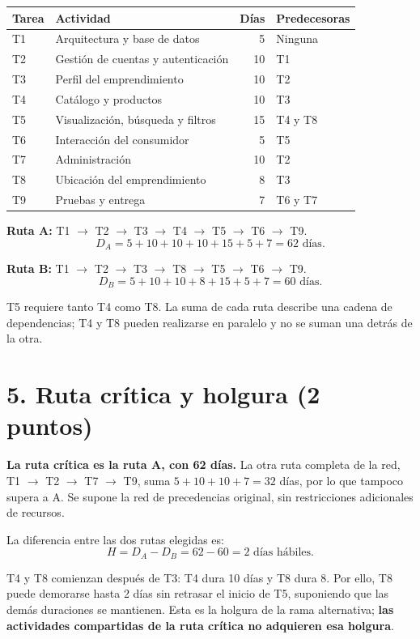 \documentclass[11pt,letterpaper]{article}
\begin{document}
\begin{center}\small
\begin{tabularx}{\linewidth}{@{}lYrY@{}}
\toprule
Tarea & Actividad & Días & Predecesoras \\\midrule
T1 & Arquitectura y base de datos & 5 & Ninguna \\
T2 & Gestión de cuentas y autenticación & 10 & T1 \\
T3 & Perfil del emprendimiento & 10 & T2 \\
T4 & Catálogo y productos & 10 & T3 \\
T5 & Visualización, búsqueda y filtros & 15 & T4 y T8 \\
T6 & Interacción del consumidor & 5 & T5 \\
T7 & Administración & 10 & T2 \\
T8 & Ubicación del emprendimiento & 8 & T3 \\
T9 & Pruebas y entrega & 7 & T6 y T7 \\\bottomrule
\end{tabularx}
\end{center}

\textbf{Ruta A:} T1 $\rightarrow$ T2 $\rightarrow$ T3 $\rightarrow$ T4
$\rightarrow$ T5 $\rightarrow$ T6 $\rightarrow$ T9.
\[
D_A=5+10+10+10+15+5+7=\boxed{62\text{ días}}.
\]

\textbf{Ruta B:} T1 $\rightarrow$ T2 $\rightarrow$ T3 $\rightarrow$ T8
$\rightarrow$ T5 $\rightarrow$ T6 $\rightarrow$ T9.
\[
D_B=5+10+10+8+15+5+7=\boxed{60\text{ días}}.
\]

T5 requiere tanto T4 como T8. La suma de cada ruta describe una cadena de
dependencias; T4 y T8 pueden realizarse en paralelo y no se suman una detrás
de la otra.

\section*{5. Ruta crítica y holgura (2 puntos)}
\textbf{La ruta crítica es la ruta A, con 62 días.} La otra ruta completa
de la red, T1 $\rightarrow$ T2 $\rightarrow$ T7 $\rightarrow$ T9, suma
$5+10+10+7=32$ días, por lo que tampoco supera a A. Se supone la red de
precedencias original, sin restricciones adicionales de recursos.

La diferencia entre las dos rutas elegidas es:
\[
H=D_A-D_B=62-60=\boxed{2\text{ días hábiles}}.
\]

T4 y T8 comienzan después de T3: T4 dura 10 días y T8 dura 8. Por ello, T8
puede demorarse hasta 2 días sin retrasar el inicio de T5, suponiendo que las
demás duraciones se mantienen. Esta es la holgura de la rama alternativa;
\textbf{las actividades compartidas de la ruta crítica no adquieren esa
holgura}.
\end{document}
